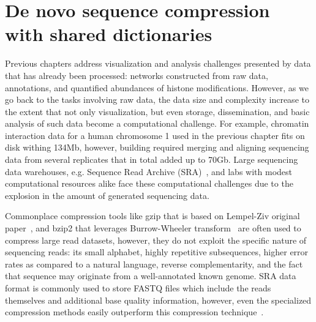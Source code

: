 \documentclass[12pt]{cmuthesis}
\begin{document}
\chapter{De novo sequence compression with shared dictionaries}



Previous chapters address visualization and analysis challenges presented by data that has already been processed: networks constructed from raw data, annotations, and quantified abundances of histone modifications. However, as we go back to the tasks involving raw data, the data size and complexity increase to the extent that not only visualization, but even storage, dissemination, and basic analysis of such data become a computational challenge. For example, chromatin interaction data for a human chromosome 1 used in the previous chapter fits on disk withing 134Mb, however, building required merging and aligning sequencing data from several replicates that in total added up to 70Gb. Large sequencing data warehouses, e.g. Sequence Read Archive (SRA)~\cite{SRA}, and labs with modest computational resources alike face these computational challenges due to the explosion in the amount of generated sequencing data.

Commonplace compression tools like gzip that is based on Lempel-Ziv original paper~\cite{LempelZiv77}, and bzip2 that leverages Burrow-Wheeler transform~\cite{BWTransform} are often used to compress large read datasets, however, they do not exploit the specific nature of sequencing reads: its small alphabet, highly repetitive subsequences, higher error rates as compared to a natural language, reverse complementarity, and the fact that sequence may originate from a well-annotated known genome. SRA data format is commonly used to store FASTQ files which include the reads themselves and additional base quality information, however, even the specialized compression methods easily outperform this compression technique~\cite{SeqSqueeze}.
\end{document}
